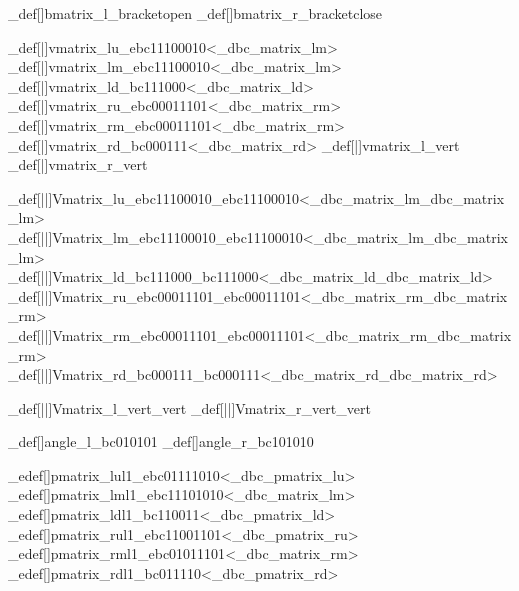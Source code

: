 \brl@char_def[]{bmatrix_l}{\brl@char@alias_bracketopen}
\brl@char_def[]{bmatrix_r}{\brl@char@alias_bracketclose}


\brl@char_def[|]{vmatrix_lu}{\brl@char_ebc11100010}<\brl@char@alias_dbc_matrix_lm>
\brl@char_def[|]{vmatrix_lm}{\brl@char_ebc11100010}<\brl@char@alias_dbc_matrix_lm>
\brl@char_def[|]{vmatrix_ld}{\brl@char_bc111000}<\brl@char@alias_dbc_matrix_ld>
\brl@char_def[|]{vmatrix_ru}{\brl@char_ebc00011101}<\brl@char@alias_dbc_matrix_rm>
\brl@char_def[|]{vmatrix_rm}{\brl@char_ebc00011101}<\brl@char@alias_dbc_matrix_rm>
\brl@char_def[|]{vmatrix_rd}{\brl@char_bc000111}<\brl@char@alias_dbc_matrix_rd>
\brl@char_def[|]{vmatrix_l}{\brl@char@alias_vert}
\brl@char_def[|]{vmatrix_r}{\brl@char@alias_vert}


\brl@char_def[||]{Vmatrix_lu}{\brl@char_ebc11100010\brl@char_ebc11100010}<\brl@char@alias_dbc_matrix_lm\brl@char@alias_dbc_matrix_lm>
\brl@char_def[||]{Vmatrix_lm}{\brl@char_ebc11100010\brl@char_ebc11100010}<\brl@char@alias_dbc_matrix_lm\brl@char@alias_dbc_matrix_lm>
\brl@char_def[||]{Vmatrix_ld}{\brl@char_bc111000\brl@char_bc111000}<\brl@char@alias_dbc_matrix_ld\brl@char@alias_dbc_matrix_ld>
\brl@char_def[||]{Vmatrix_ru}{\brl@char_ebc00011101\brl@char_ebc00011101}<\brl@char@alias_dbc_matrix_rm\brl@char@alias_dbc_matrix_rm>
\brl@char_def[||]{Vmatrix_rm}{\brl@char_ebc00011101\brl@char_ebc00011101}<\brl@char@alias_dbc_matrix_rm\brl@char@alias_dbc_matrix_rm>
\brl@char_def[||]{Vmatrix_rd}{\brl@char_bc000111\brl@char_bc000111}<\brl@char@alias_dbc_matrix_rd\brl@char@alias_dbc_matrix_rd>

\brl@char_def[||]{Vmatrix_l}{\brl@char@alias_vert\brl@char@alias_vert}
\brl@char_def[||]{Vmatrix_r}{\brl@char@alias_vert\brl@char@alias_vert}



\brl@char_def[]{angle_l}{\brl@char_bc010101}
\brl@char_def[]{angle_r}{\brl@char_bc101010}




\brl@char_edef[]{pmatrix_lul1}{\brl@char_ebc01111010}<\brl@char@alias_dbc_pmatrix_lu>
\brl@char_edef[]{pmatrix_lml1}{\brl@char_ebc11101010}<\brl@char@alias_dbc_matrix_lm>
\brl@char_edef[]{pmatrix_ldl1}{\brl@char_bc110011}<\brl@char@alias_dbc_pmatrix_ld>
\brl@char_edef[]{pmatrix_rul1}{\brl@char_ebc11001101}<\brl@char@alias_dbc_pmatrix_ru>
\brl@char_edef[]{pmatrix_rml1}{\brl@char_ebc01011101}<\brl@char@alias_dbc_matrix_rm>
\brl@char_edef[]{pmatrix_rdl1}{\brl@char_bc011110}<\brl@char@alias_dbc_pmatrix_rd>

